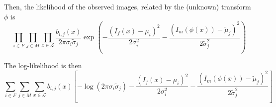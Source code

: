 \documentclass[11pt]{article}
\begin{document}
Then, the likelihood of the observed images, related by the (unknown) transform $\phi$ is
\begin{equation}
	\prod_{i\in F} \prod_{j\in M}\prod_{x\in\mathcal{L}}\frac{b_{i,j}(x)}{2\pi\sigma_i\tilde{\sigma}_j}\exp\left(
	-\frac{\left(I_{f}(x) - \mu_{i}\right)^2}{2\sigma_{i}^2}
	- \frac{\left(I_{m}(\phi(x)) - \tilde{\mu}_{j}\right)^2}{2\tilde{\sigma}_{j}^2}\right)
\end{equation}

The log-likelihood is then
\begin{equation}
	\sum_{i\in F}\sum_{j\in M}\sum_{x \in\mathcal{L}}b_{i,j}(x)\left[-\log(2\pi\sigma_{i}\tilde{\sigma}_j)-
	\frac{\left(I_{f}(x) - \mu_{i}\right)^2}{2\sigma_{i}^2}
	- \frac{\left(I_{m}(\phi(x)) - \tilde{\mu}_{j}\right)^2}{2\tilde{\sigma}_{j}^2}
	\right]
\end{equation}
\end{document}
